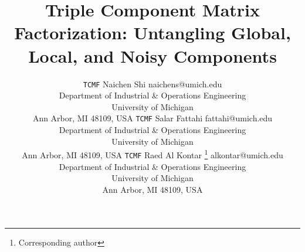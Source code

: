 \documentclass[twoside,11pt]{article}
\def\name{\texttt{TCMF}\xspace}
\begin{document}


\title{Triple Component Matrix Factorization: Untangling Global, Local, and Noisy Components}

\author{\name Naichen Shi \email naichens@umich.edu \\
       \addr Department of Industrial \& Operations Engineering\\
       University of Michigan\\
       Ann Arbor, MI 48109, USA       
       \AND
       \name Salar Fattahi \email fattahi@umich.edu \\
       \addr Department of Industrial \& Operations Engineering\\
       University of Michigan\\
       Ann Arbor, MI 48109, USA
       \AND
       \name Raed Al Kontar \thanks{Corresponding author} \email alkontar@umich.edu \\
       \addr Department of Industrial \& Operations Engineering\\
       University of Michigan\\
       Ann Arbor, MI 48109, USA}

\maketitle
\end{document}
